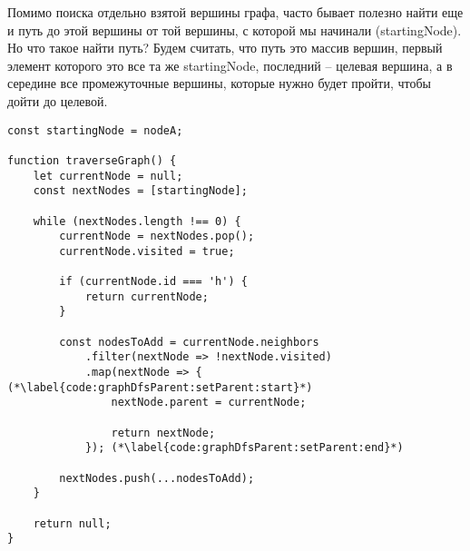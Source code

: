 \documentclass[../../article.tex]{subfiles}
\begin{document}
Помимо поиска отдельно взятой вершины графа, часто бывает полезно найти еще и путь до этой вершины от той вершины, с которой мы начинали ({\firacodebold startingNode}). Но что такое найти путь? Будем считать, что путь это массив вершин, первый элемент которого это все та же {\firacodebold startingNode}, последний – целевая вершина, а в середине все промежуточные вершины, которые нужно будет пройти, чтобы дойти до целевой.

\begin{figure*}
    \begin{ruledelement}
        \begin{lstlisting}[caption={Обход графа в глубину и формирование обратного дерева обхода}, label={lst:graphDfsParent}]
const startingNode = nodeA;

function traverseGraph() {
    let currentNode = null;
    const nextNodes = [startingNode];

    while (nextNodes.length !== 0) {
        currentNode = nextNodes.pop();
        currentNode.visited = true;

        if (currentNode.id === 'h') {
            return currentNode;
        }

        const nodesToAdd = currentNode.neighbors
            .filter(nextNode => !nextNode.visited)
            .map(nextNode => { (*\label{code:graphDfsParent:setParent:start}*)
                nextNode.parent = currentNode;

                return nextNode;
            }); (*\label{code:graphDfsParent:setParent:end}*)

        nextNodes.push(...nodesToAdd);
    }

    return null;
}
        \end{lstlisting}
    \end{ruledelement}

\end{figure*}
\end{document}
